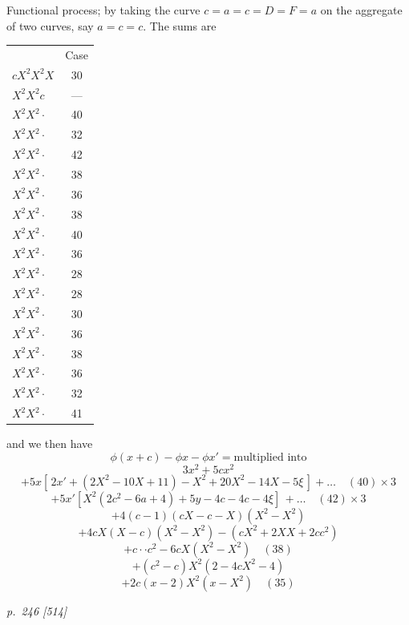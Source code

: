 \documentclass[11pt,a4paper]{article}
\theoremstyle{plain}
\theoremstyle{definition}
\begin{document}
Functional process; by taking the curve $c = a = c = D = F = a$ on the aggregate of two
curves, say $a = c = c$.  The sums are

\begin{center}
\begin{tabular}{lc}
& Case \\
$cX^2 X^2 X$ & 30 \\
$X^2 X^2 c$ & --- \\
$X^2 X^2 \cdot$ & 40 \\
$X^2 X^2 \cdot$ & 32 \\
$X^2 X^2 \cdot$ & 42 \\
$X^2 X^2 \cdot$ & 38 \\
$X^2 X^2 \cdot$ & 36 \\
$X^2 X^2 \cdot$ & 38 \\
$X^2 X^2 \cdot$ & 40 \\
$X^2 X^2 \cdot$ & 36 \\
$X^2 X^2 \cdot$ & 28 \\
$X^2 X^2 \cdot$ & 28 \\
$X^2 X^2 \cdot$ & 30 \\
$X^2 X^2 \cdot$ & 36 \\
$X^2 X^2 \cdot$ & 38 \\
$X^2 X^2 \cdot$ & 36 \\
$X^2 X^2 \cdot$ & 32 \\
$X^2 X^2 \cdot$ & 41 \\
\end{tabular}
\end{center}

and we then have
\[
\phi(x + c) - \phi x - \phi x' = \text{multiplied into}
\]
\[
3x^2 + 5cx^2
\]
\[
+ 5x[\,2x' + (2X^2 - 10X + 11) - X^2 + 20X^2 - 14X - 5\xi\,] + \ldots \quad (40) \times 3
\]
\[
+ 5x'[X^2(2c^2 - 6a + 4) + 5y - 4c - 4c - 4\xi]\,+\ldots \quad (42) \times 3
\]
\[
+ 4(c - 1)(cX - c - X)(X^2 - X^2)
\]
\[
+ 4cX(X - c)(X^2 - X^2) - (cX^2 + 2XX + 2cc^2)
\]
\[
+ c\cdot \cdot c^2 - 6c X(X^2 - X^2) \quad (38)
\]
\[
+ (c^2 - c)X^2(2 - 4cX^2 - 4)
\]
\[
+ 2c(x - 2)X^2(x - X^2) \quad (35)
\]

\clearpage

\bigskip
\textit{p.~246 [514]}
\smallskip
\end{document}

